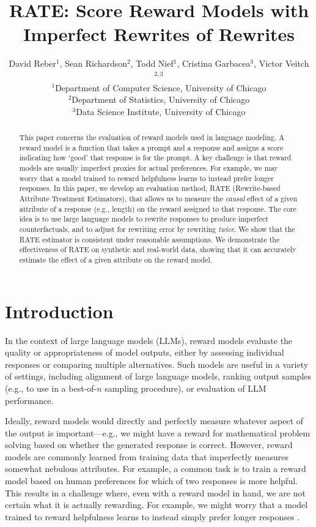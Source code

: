 \documentclass{article}
\title{RATE: Score Reward Models with Imperfect Rewrites of Rewrites}
\author{David Reber$^{1}$, Sean Richardson$^{2}$, Todd Nief$^{1}$, Cristina Garbacea$^{3}$, Victor Veitch$^{2,3}$ \\
$^1$Department of Computer Science, University of Chicago \\
$^2$Department of Statistics, University of Chicago \\
$^3$Data Science Institute, University of Chicago \\
}
\begin{document}
\maketitle

\begin{abstract}
This paper concerns the evaluation of reward models used in language modeling. A reward model is a function that takes a prompt and a response and assigns a score indicating how `good' that response is for the prompt. A key challenge is that reward models are usually imperfect proxies for actual preferences. For example, we may worry that a model trained to reward helpfulness learns to instead prefer longer responses. 
In this paper, we develop an evaluation method, RATE (Rewrite-based Attribute Treatment Estimators), that allows us to measure the \emph{causal} effect of a given attribute of a response (e.g., length) on the reward assigned to that response. 
The core idea is to use large language models to rewrite responses to produce imperfect counterfactuals, and to adjust for rewriting error by rewriting \emph{twice}. We show that the RATE estimator is consistent under reasonable assumptions. We demonstrate the effectiveness of RATE on synthetic and real-world data, showing that it can accurately estimate the effect of a given attribute on the reward model.
\end{abstract}
  
\section{Introduction}
\label{sec:introduction}
In the context of large language models (LLMs), reward models evaluate the quality or appropriateness of model outputs, either by assessing individual responses or comparing multiple alternatives. Such models are useful in a variety of settings, including alignment of large language models, ranking output samples (e.g., to use in a best-of-$n$ sampling procedure), or evaluation of LLM performance.

Ideally, reward models would directly and perfectly measure whatever aspect of the output is important---e.g., we might have a reward for mathematical problem solving based on whether the generated response is correct. 
However, reward models are commonly learned from training data that imperfectly measures somewhat nebulous attributes. For example, a common task is to train a reward model based on human preferences for which of two responses is more helpful.
This results in a challenge where, even with a reward model in hand, we are not certain what it is actually rewarding.
For example, we might worry that a model trained to reward helpfulness learns to instead simply prefer longer responses \citep{shen2023looselipssinkships, park2024disentanglinglengthqualitydirect,singhal2024longwaygoinvestigating}.
\end{document}
